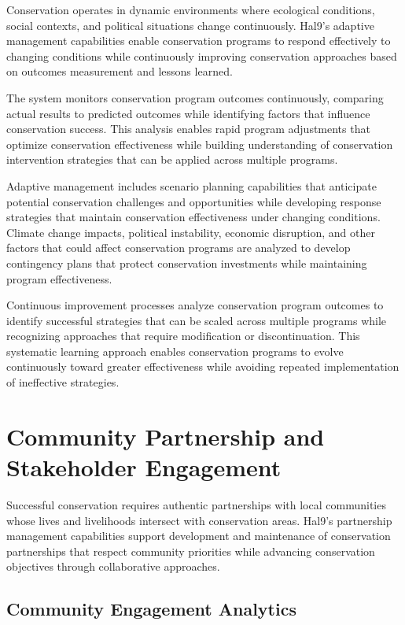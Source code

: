 \documentclass[
  Letterpaper,
]{scrbook}
\begin{document}
Conservation operates in dynamic environments where ecological
conditions, social contexts, and political situations change
continuously. Hal9's adaptive management capabilities enable
conservation programs to respond effectively to changing conditions
while continuously improving conservation approaches based on outcomes
measurement and lessons learned.

The system monitors conservation program outcomes continuously,
comparing actual results to predicted outcomes while identifying factors
that influence conservation success. This analysis enables rapid program
adjustments that optimize conservation effectiveness while building
understanding of conservation intervention strategies that can be
applied across multiple programs.

Adaptive management includes scenario planning capabilities that
anticipate potential conservation challenges and opportunities while
developing response strategies that maintain conservation effectiveness
under changing conditions. Climate change impacts, political
instability, economic disruption, and other factors that could affect
conservation programs are analyzed to develop contingency plans that
protect conservation investments while maintaining program
effectiveness.

Continuous improvement processes analyze conservation program outcomes
to identify successful strategies that can be scaled across multiple
programs while recognizing approaches that require modification or
discontinuation. This systematic learning approach enables conservation
programs to evolve continuously toward greater effectiveness while
avoiding repeated implementation of ineffective strategies.

\section{Community Partnership and Stakeholder
Engagement}\label{community-partnership-and-stakeholder-engagement}

Successful conservation requires authentic partnerships with local
communities whose lives and livelihoods intersect with conservation
areas. Hal9's partnership management capabilities support development
and maintenance of conservation partnerships that respect community
priorities while advancing conservation objectives through collaborative
approaches.

\subsection{Community Engagement
Analytics}\label{community-engagement-analytics}
\end{document}
